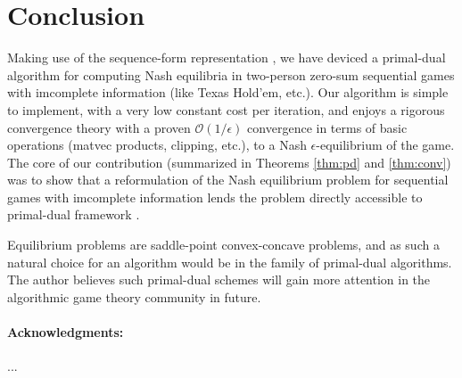 \documentclass[12pt]{article}
\begin{document}
\section{Conclusion}
Making use of the sequence-form representation \cite{koller1992complexity, von1996efficient, vonequilibrium}, we have deviced a primal-dual algorithm for computing Nash equilibria in two-person zero-sum sequential games with imcomplete information (like Texas Hold'em, etc.). Our algorithm is simple to implement, with a very low constant cost per iteration, and enjoys a rigorous convergence theory with a proven $\mathcal{O}(1/\epsilon)$ convergence in terms of basic operations (matvec products, clipping, etc.), to a Nash $\epsilon$-equilibrium of the game. The core of our contribution (summarized in Theorems \ref{thm:pd} and \ref{thm:conv}) was to show that a reformulation of the Nash equilibrium problem for sequential games with imcomplete information lends the problem directly accessible to primal-dual framework \cite{chambolle2010, chambolle2014ergodic}.

Equilibrium problems are saddle-point convex-concave problems, and as such a natural choice for an algorithm would be in the family of primal-dual algorithms. The author believes such primal-dual schemes will gain more attention in the algorithmic game theory community in future.

\medskip \noindent

\paragraph{Acknowledgments:} ...
\small

% 

\end{document}
